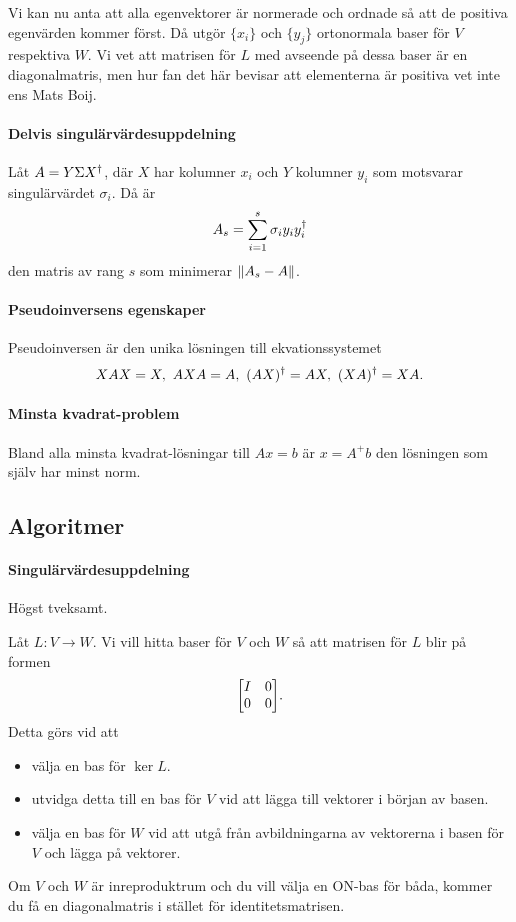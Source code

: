 Vi kan nu anta att alla egenvektorer är normerade och ordnade så att de positiva egenvärden kommer först. Då utgör $\{x_{i}\}$ och $\{y_{j}\}$ ortonormala baser för $V$ respektiva $W$. Vi vet att matrisen för $L$ med avseende på dessa baser är en diagonalmatris, men hur fan det här bevisar att elementerna är positiva vet inte ens Mats Boij.

\paragraph{Delvis singulärvärdesuppdelning}
Låt $A = Y\Sigma X^{\dagger}$, där $X$ har kolumner $x_{i}$ och $Y$ kolumner $y_{i}$ som motsvarar singulärvärdet $\sigma_{i}$. Då är
\begin{align*}
	A_{s} = \sum\limits_{i = 1}^{s}\sigma_{i}y_{i}y_{i}^{\dagger}
\end{align*}
den matris av rang $s$ som minimerar $\norm{A_{s} - A}$.

\proof

\paragraph{Pseudoinversens egenskaper}
Pseudoinversen är den unika lösningen till ekvationssystemet
\begin{align*}
	XAX = X,\ AXA = A,\ (AX)^{\dagger} = AX,\ (XA)^{\dagger} = XA.
\end{align*}

\proof

\paragraph{Minsta kvadrat-problem}
Bland alla minsta kvadrat-lösningar till $Ax = b$ är $x = A^{+}b$ den lösningen som själv har minst norm.

\proof

\subsection{Algoritmer}

\paragraph{Singulärvärdesuppdelning}
Högst tveksamt.

Låt $L: V\to W$. Vi vill hitta baser för $V$ och $W$ så att matrisen för $L$ blir på formen
\begin{align*}
	\mqty[
		I & 0 \\
		0 & 0
	].
\end{align*}
Detta görs vid att
\begin{itemize}
	\item välja en bas för $\ker{L}$.
	\item utvidga detta till en bas för $V$ vid att lägga till vektorer i början av basen.
	\item välja en bas för $W$ vid att utgå från avbildningarna av vektorerna i basen för $V$ och lägga på vektorer.
\end{itemize}

Om $V$ och $W$ är inreproduktrum och du vill välja en ON-bas för båda, kommer du få en diagonalmatris i stället för identitetsmatrisen.